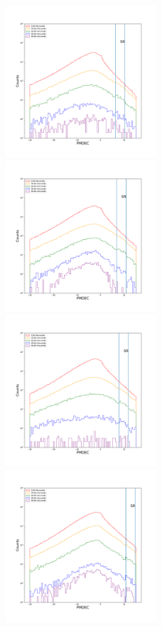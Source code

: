\documentclass[12pt,prd]{article}
\begin{document}
\begin{figure}[h!]
\includegraphics[width=0.5\textwidth]{../figures/scanning_plotsgaiascan_l45_0_b82_2_ra201_5_dec28_5_npy.pdf}
\includegraphics[width=0.5\textwidth]{../figures/scanning_plotsgaiascan_l67_5_b74_4_ra208_6_dec35_1_npy.pdf}
\includegraphics[width=0.5\textwidth]{../figures/scanning_plotsgaiascan_l75_0_b66_4_ra216_0_dec41_0_npy.pdf}
\includegraphics[width=0.5\textwidth]{../figures/scanning_plotsgaiascan_l78_8_b58_4_ra224_7_dec46_3_npy.pdf}

\end{figure}
\end{document}
